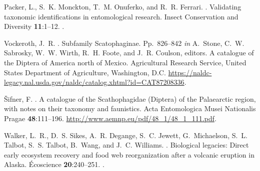 \begin{thebibliography}{8}
Packer, L., S.~K. Monckton, T.~M. Onuferko, and R.~R. Ferrari.
.
\newblock Validating taxonomic identifications in entomological research.
\newblock Insect Conservation and Diversity {\bfseries 11}:1--12.
\newblock {}.

Vockeroth, J.~R.
.
\newblock Subfamily {Scatophaginae}.
\newblock Pp.\ 826--842 {\em in\/} A.~Stone, C.~W. Sabrosky, W.~W. Wirth, R.~H.
  Foote, and J.~R. Coulson, editors. A catalogue of the {Diptera} of {America}
  north of {Mexico}. Agricultural Research Service, United States Department of
  Agriculture, Washington, D.C.
\newblock
  \urlprefix\url{https://naldc-legacy.nal.usda.gov/naldc/catalog.xhtml?id=CAT87208336}.

\v{S}ifner, F.
.
\newblock A catalogue of the Scathophagidae (Diptera) of the Palaearctic
  region, with notes on their taxonomy and faunistics.
\newblock Acta Entomologica Musei Nationalis Pragae {\bfseries 48}:111--196.
\newblock \urlprefix\url{http://www.aemnp.eu/pdf/48_1/48_1_111.pdf}.

Walker, L.~R., D.~S. Sikes, A.~R. Degange, S.~C. Jewett, G.~Michaelson, S.~L.
  Talbot, S.~S. Talbot, B.~Wang, and J.~C. Williams.
.
\newblock Biological legacies: Direct early ecosystem recovery and food web
  reorganization after a volcanic eruption in Alaska.
\newblock Écoscience {\bfseries 20}:240--251.
\newblock {}.

\end{thebibliography}
